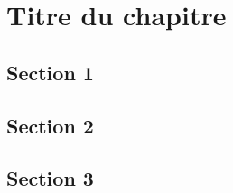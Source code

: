 \chapter{Titre du chapitre}
\minitoc


\newpage
\section{Section 1}
\lipsum[1-1]
\section{Section 2}
\lipsum[1-1]
\section{Section 3}
\lipsum[1-1]

